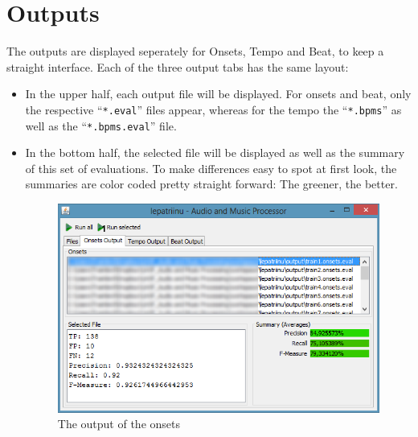 \section{Outputs}
The outputs are displayed seperately for Onsets, Tempo and Beat, to keep a
straight interface. Each of the three output tabs has the same layout:

\begin{itemize}
  \item In the upper half, each output file will be displayed. For onsets and
  beat, only the respective ``\texttt{*.eval}'' files appear, whereas for the
  tempo the ``\texttt{*.bpms}'' as well as the ``\texttt{*.bpms.eval}'' file.
  \item In the bottom half, the selected file will be displayed as well as the
  summary of this set of evaluations. To make differences easy to spot at first
  look, the summaries are color coded pretty straight forward: The greener, the
  better.
  \begin{figure}[htp]
  \begin{center}
  	\includegraphics[width=\textwidth]{chapter/GUIOutput}
  	\caption{The output of the onsets}
  	\label{fig:gui}
  \end{center}
  \end{figure}
\end{itemize}
